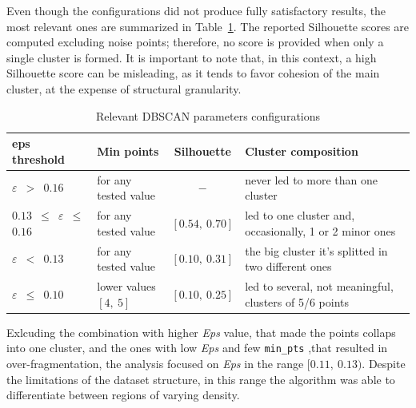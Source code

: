 Even though the configurations did not produce fully satisfactory results, the most relevant ones are summarized in Table~\ref{tab:eps}. 
The reported Silhouette scores are computed excluding noise points; therefore, no score is provided when only a single cluster is formed. 
It is important to note that, in this context, a high Silhouette score can be misleading, as it tends to favor cohesion of the main cluster, at the expense of structural granularity. 
\begin{table}[h]
\centering
\begin{tabular}{llcl}
\toprule
\textbf{eps threshold} & \textbf{Min points} & \textbf{Silhouette} & \textbf{Cluster composition}  \\
\midrule
\texttt{\textbf{$\varepsilon$} $>$ $0.16$} & for any tested value & \texttt{$-$} & never led to more than one cluster \\
\texttt{$0.13$ $\leq$ \textbf{$\varepsilon$} $\leq$ $0.16$} & for any tested value &  $[0.54,\ 0.70]$  & led to one cluster and, occasionally, 1 or 2 minor ones\\
\texttt{\textbf{$\varepsilon$} $<$ $0.13$}& for any tested value & $[0.10,\ 0.31]$ & the big cluster it's splitted in two different ones \\
\texttt{\textbf{$\varepsilon$} $\leq$ $0.10$} & lower values $[4,\ 5]$& $[0.10,\ 0.25]$  & led to several, not meaningful, clusters of 5/6 points\\
\bottomrule
\end{tabular}
\caption{Relevant DBSCAN parameters configurations}
\label{tab:eps}
\end{table}



Exlcuding the combination with higher \textit{Eps} value, that made the points collaps into one cluster, and the ones with low \textit{Eps} and few \texttt{min\_pts} ,that resulted in over-fragmentation, 
the analysis focused on \textit{Eps} in the range $[0.11,\ 0.13)$.
Despite the limitations of the dataset structure, in this range the algorithm was able to differentiate between regions of varying density.


